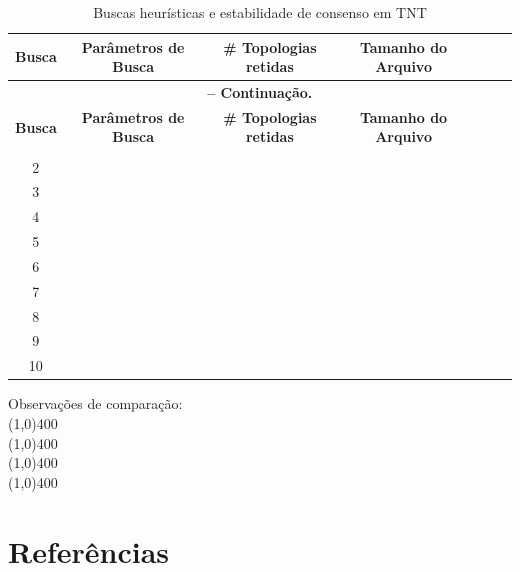 \begin{refsection}
\pagestyle{fancy}
\begin{center}

\begin{longtable}{|c|c|c|c|c|c|c|}
\caption[Tabela \ref{tut6:table:stability}: Buscas heurísticas e estabilidade de consenso em TNT]{Buscas heurísticas e estabilidade de consenso em TNT} \label{tut6:table:stability} \\


\hline\hline \textbf{Busca} & \textbf{Parâmetros de Busca}  & \textbf{\# Topologias retidas} & \textbf{Tamanho do Arquivo}\\
\endfirsthead

\multicolumn{6}{c}{{\bfseries \tablename\ \thetable{} -- Continuação.}}\\
\hline\hline \textbf{Busca} & \textbf{Parâmetros de Busca}  & \textbf{\# Topologias retidas} & \textbf{Tamanho do Arquivo}\\
\endhead
\hline \hline
\endlastfoot

\hline1 &  &  & \\
\hline2 &  &  & \\
\hline3 &  &  & \\
\hline4 &  &  & \\
\hline5 &  &  & \\
\hline6 &  &  & \\
\hline7 &  &  & \\
\hline8 &  &  & \\
\hline9 &  &  & \\
\hline10 &  &  & \\

\end{longtable}
\end{center}

	
Observações de comparação:\\
	\line(1,0){400}\\
	\line(1,0){400}\\
	\line(1,0){400}\\
	\line(1,0){400}\\

\section{Referências}\label{tut6:refs}
\printbibliography[heading=none]
\end{refsection}
%

